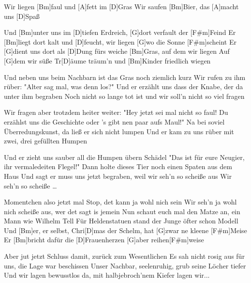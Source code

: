 

\begin{guitar}
	Wir liegen [Bm]faul und [A]fett im [D]Gras
	Wir saufen [Bm]Bier, das [A]macht uns [D]Spaß
	
	Und [Bm]unter uns im [D]tiefen Erdreich, [G]dort verfault der [F#m]Feind
	Er [Bm]liegt dort kalt und [D]feucht, wir liegen [G]wo die Sonne [F#m]scheint
	Er [G]dient uns dort als [D]Dung fürs weiche [Bm]Gras, auf dem wir liegen
	Auf [G]dem wir süße Tr[D]{ä}ume träum'n und [Bm]Kinder friedlich wiegen
	
	 
	
	Und neben uns beim Nachbarn ist das Gras noch ziemlich kurz
	Wir rufen zu ihm rüber: "Alter sag mal, was denn los?"
	Und er erzählt uns dass der Knabe, der da unter ihm begraben
	Noch nicht so lange tot ist und wir soll'n nicht so viel fragen
	
	Wir fragen aber trotzdem heiter weiter: "Hey jetzt sei mal nicht so faul!
	Du erzählst uns die Geschichte oder 's gibt nen paar aufs Maul!"
	Na bei soviel Überredungskunst, da ließ er sich nicht lumpen
	Und er kam zu uns rüber mit zwei, drei gefüllten Humpen
	
	 
	
	Und er zieht uns sauber all die Humpen übern Schädel
	"Das ist für eure Neugier, ihr vermaledeiten Flegel!"
	Dann holte dieses Tier noch einen Spaten aus dem Haus
	Und sagt er muss uns jetzt begraben, weil wir seh'n so scheiße aus
	Wir seh'n so scheiße …
	
	Momentchen also jetzt mal Stop, det kann ja wohl nich sein
	Wir seh'n ja wohl nich scheiße aus, wer det sagt is jemein
	Nun schaut euch mal den Matze an, ein Mann wie Wilhelm Tell
	Für Heldenstatuen stand der Junge öfter schon Modell
	Und [Bm]er, er selbst, Chri[D]mas der Schelm, hat [G]zwar ne kleene [F#m]Meise
	Er [Bm]bricht dafür die [D]Frauenherzen [G]aber reihen[F#m]weise
	
	Aber jut jetzt Schluss damit, zurück zum Wesentlichen
	Es sah nicht rosig aus für uns, die Lage war beschissen
	Unser Nachbar, seelenruhig, grub seine Löcher tiefer
	Und wir lagen bewusstlos da, mit halbjebroch'nem Kiefer lagen wir...
	

\end{guitar}
